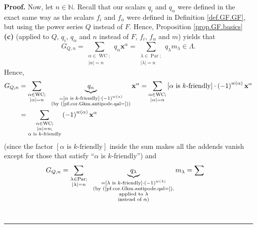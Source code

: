 \documentclass[numbers=enddot,12pt,final,onecolumn,notitlepage]{scrartcl}%
\theoremstyle{definition}
\newenvironment{proof}[1][Proof]{\noindent\textbf{#1.} }{\ \rule{0.5em}{0.5em}}
\let\sumnonlimits\sum
\renewcommand{\sum}{\sumnonlimits\limits}
\begin{document}
\begin{proof}
Now, let $n\in\mathbb{N}$. Recall that our scalars $q_{i}$ and $q_{\alpha}$
were defined in the exact same way as the scalars $f_{i}$ and $f_{\alpha}$
were defined in Definition \ref{def.GF.GF}, but using the power series $Q$
instead of $F$. Hence, Proposition \ref{prop.GF.basics} \textbf{(c)} (applied
to $Q$, $q_{i}$, $q_{\alpha}$ and $n$ instead of $F$, $f_{i}$, $f_{\alpha}$
and $m$) yields that%
\[
G_{Q,n}=\sum_{\substack{\alpha\in\operatorname*{WC};\\\left\vert
\alpha\right\vert =n}}q_{\alpha}\mathbf{x}^{\alpha}=\sum_{\substack{\lambda
\in\operatorname*{Par};\\\left\vert \lambda\right\vert =n}}q_{\lambda
}m_{\lambda}\in\Lambda.
\]
Hence,%
\begin{align}
G_{Q,n}  &  =\sum_{\substack{\alpha\in\operatorname*{WC};\\\left\vert
\alpha\right\vert =n}}\ \ \underbrace{q_{\alpha}}_{\substack{=\left[
\alpha\text{ is }k\text{-friendly}\right]  \cdot\left(  -1\right)  ^{w\left(
\alpha\right)  }\\\text{(by (\ref{pf.cor.Gkm.antipode.qal=}))}}}\mathbf{x}%
^{\alpha}=\sum_{\substack{\alpha\in\operatorname*{WC};\\\left\vert
\alpha\right\vert =n}}\left[  \alpha\text{ is }k\text{-friendly}\right]
\cdot\left(  -1\right)  ^{w\left(  \alpha\right)  }\mathbf{x}^{\alpha
}\nonumber\\
&  =\sum_{\substack{\alpha\in\operatorname*{WC};\\\left\vert \alpha\right\vert
=n;\\\alpha\text{ is }k\text{-friendly}}}\left(  -1\right)  ^{w\left(
\alpha\right)  }\mathbf{x}^{\alpha} \label{pf.cor.Gkm.antipode.GHn=1}%
\end{align}
(since the factor $\left[  \alpha\text{ is }k\text{-friendly}\right]  $ inside
the sum makes all the addends vanish except for those that satisfy
\textquotedblleft$\alpha$ is $k$-friendly\textquotedblright) and%
\begin{align}
G_{Q,n}  &  =\sum_{\substack{\lambda\in\operatorname*{Par};\\\left\vert
\lambda\right\vert =n}}\ \ \underbrace{q_{\lambda}}_{\substack{=\left[
\lambda\text{ is }k\text{-friendly}\right]  \cdot\left(  -1\right)  ^{w\left(
\lambda\right)  }\\\text{(by (\ref{pf.cor.Gkm.antipode.qal=}),}\\\text{applied
to }\lambda\\\text{instead of }\alpha\text{)}}}m_{\lambda}=\sum

\end{align}
\end{proof}
\end{document}
